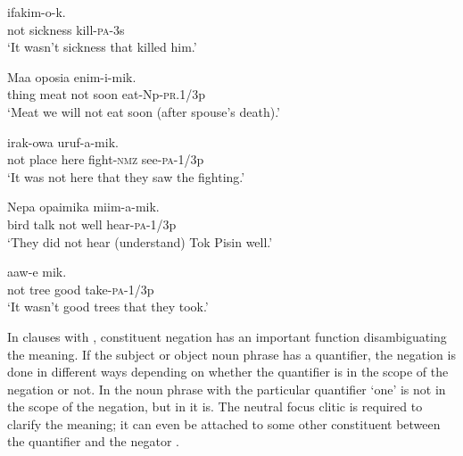 \ea%
\label{ex:6:x1102}
\gll {}    ifakim-o-k. \\
not  sickness  kill-\textsc{pa}-3s\\
\glt `It wasn't sickness that killed him.'
\z

\ea%
\label{ex:6:x1103}
\gll Maa  oposia      enim-i-mik. \\
thing  meat  not  soon  eat-Np-\textsc{pr}.1/3p\\
\glt `Meat we will not eat soon (after spouse's death).'
\z

\ea%
\label{ex:6:x1108}
\gll {}      irak-owa  uruf-a-mik. \\
not  place  here  fight-\textsc{nmz}  see-\textsc{pa}-1/3p\\
\glt `It was not here that they saw the fighting.'
\z

\ea%
\label{ex:6:x1104}
\gll Nepa  opaimika      miim-a-mik. \\
bird  talk  not  well  hear-\textsc{pa}-1/3p\\
\glt `They did not hear (understand) Tok Pisin well.'
\z

\ea%
\label{ex:6:x1105}
\gll {}     aaw-e\textstyleEmphasizedVernacularWords{-} mik. \\
not  tree  good  take-\textsc{pa}-1/3p\\
\glt `It wasn't good trees that they took.'
\z

In clauses with , constituent negation has an important function disambiguating the meaning. If the subject or object noun phrase has a quantifier, the negation is done in different ways depending on whether the quantifier is in the scope of the negation or not. In  the noun phrase with the particular quantifier  `one' is not in the scope of the negation, but in  it is. The neutral focus clitic is required to clarify the meaning; it can even be attached to some other constituent between the quantifier and the negator .

